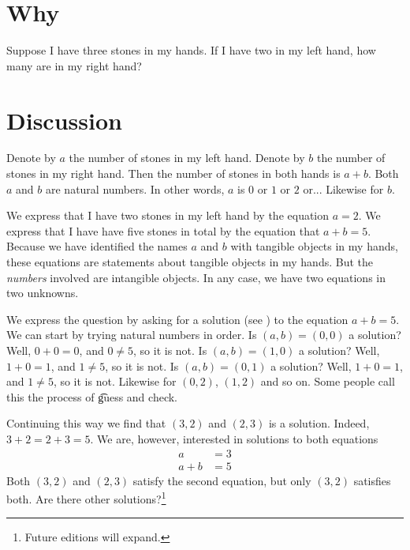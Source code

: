 

\section*{Why}

Suppose I have three stones in my hands.
If I have two in my left hand, how many are in my right hand?

\section*{Discussion}

Denote by $a$ the number of stones in my left hand.
Denote by $b$ the number of stones in my right hand.
Then the number of stones in both hands is $a + b$.
Both $a$ and $b$ are natural numbers.
In other words, $a$ is $0$ or $1$ or $2$ or...
Likewise for $b$.

We express that I have two stones in my left hand by the equation $a = 2$.
We express that I have have five stones in total by the equation that $a + b = 5$.
Because we have identified the names $a$ and $b$ with tangible objects in my hands, these equations are statements about tangible objects in my hands.
But the \textit{numbers} involved are intangible objects.
In any case, we have two equations in two unknowns.

We express the question  by asking for a solution (see ) to the equation $a + b = 5$.
We can start by trying natural numbers in order.
Is $(a, b) = (0, 0)$ a solution?
Well, $0 + 0 = 0$, and $0 \neq 5$, so it is not.
Is $(a, b) = (1, 0)$ a solution?
Well, $1 + 0 = 1$, and $1 \neq 5$, so it is not.
Is $(a, b) = (0, 1)$ a solution?
Well, $1 + 0 = 1$, and $1 \neq 5$, so it is not.
Likewise for $(0, 2)$, $(1, 2)$ and so on.
Some people call this the process of \t{guess and check}.

Continuing this way we find that $(3, 2)$ and $(2, 3)$ is a solution.
Indeed, $3 + 2 = 2 + 3 = 5$.
We are, however, interested in solutions to both equations
    \[
\begin{aligned}
a &= 3 \\
a + b &= 5
\end{aligned}
    \]
Both $(3, 2)$ and $(2, 3)$ satisfy the second equation, but only $(3, 2)$ satisfies both.
Are there other solutions?\footnote{Future editions will expand.}

\blankpage